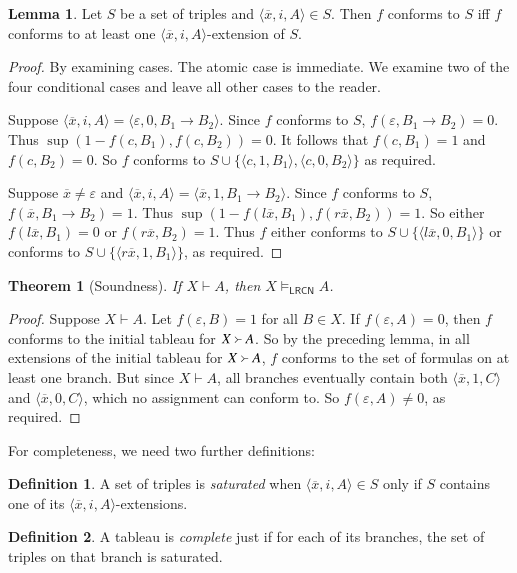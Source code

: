 \documentclass{amsart}
\newtheorem{theorem}{Theorem}
\theoremstyle{definition}
\newtheorem{lemma}{Lemma}
\newtheorem{mdef}{Definition}
\newcommand{\LRCN}{\mathsf{LRCN}}
\begin{document}
\begin{lemma}
    Let $S$ be a set of triples and $\langle\overline{x},i,A\rangle\in S$. Then $f$ conforms to $S$ iff $f$ conforms to at least one $\langle\overline{x},i,A\rangle$-extension of $S$.
\end{lemma}
\begin{proof}
    By examining cases. The atomic case is immediate. We examine two of the four conditional cases and leave all other cases to the reader.

    Suppose $\langle\overline{x},i,A\rangle=\langle\varepsilon,0,B_1\to B_2\rangle$. Since $f$ conforms to $S$, $f(\varepsilon,B_1\to B_2)=0$. Thus $\sup(1-f(c,B_1),f(c,B_2))=0$. It follows that $f(c,B_1)=1$ and $f(c,B_2)=0$. So $f$ conforms to $S\cup\{\langle c,1,B_1\rangle,\langle c,0,B_2\rangle\}$ as required.

    Suppose $\overline{x}\neq\varepsilon$ and $\langle\overline{x},i,A\rangle=\langle\overline{x},1,B_1\to B_2\rangle$. Since $f$ conforms to $S$, $f(\overline{x},B_1\to B_2)=1$. Thus $\sup(1-f(l\overline{x},B_1),f(r\overline{x},B_2))=1$. So either $f(l\overline{x},B_1)=0$ or $f(r\overline{x},B_2)=1$. Thus $f$ either conforms to $S\cup\{\langle l\overline{x},0,B_1\rangle\}$ or conforms to $S\cup\{\langle r\overline{x},1,B_1\rangle\}$, as required.
\end{proof}

\begin{theorem}[Soundness]\label{theorem:soundness-LRCN}
    If $X\vdash A$, then $X\vDash_{\LRCN} A$.
\end{theorem}
\begin{proof}
    Suppose $X\vdash A$. Let $f(\varepsilon,B)=1$ for all $B\in X$. If $f(\varepsilon,A)=0$, then $f$ conforms to the initial tableau for $X\Yright A$. So by the preceding lemma, in all extensions of the initial tableau for $X\Yright A$, $f$ conforms to the set of formulas on at least one branch. But since $X\vdash A$, all branches eventually contain both $\langle\overline{x},1,C\rangle$ and $\langle\overline{x},0,C\rangle$, which no assignment can conform to. So $f(\varepsilon,A)\neq 0$, as required.
\end{proof}

For completeness, we need two further definitions:
\begin{mdef}
    A set of triples is \emph{saturated} when $\langle\overline{x},i,A\rangle\in S$ only if $S$ contains one of its $\langle\overline{x},i,A\rangle$-extensions.
\end{mdef}
\begin{mdef}
     A tableau is \emph{complete} just if for each of its branches, the set of triples on that branch is saturated. 
\end{mdef}
\end{document}
